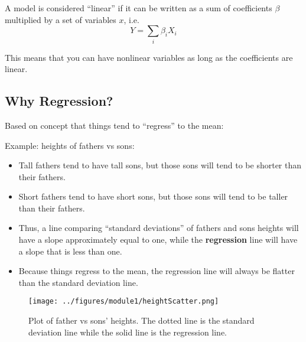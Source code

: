 \documentclass[12pt]{../notes}
\begin{document}
A model is considered ``linear'' if it can be written as a sum of coefficients $\beta$ multiplied by a set of variables $x$, i.e. 
\[Y = \sum_i\beta_iX_i\]

This means that you can have nonlinear variables as long as the coefficients are linear.


\begin{minipage}[l][0.25cm][c]{\textwidth}
\end{minipage}

\subsection{Why Regression?}
Based on concept that things tend to ``regress'' to the mean:

Example: heights of fathers vs sons:
\begin{itemize}
\item Tall fathers tend to have tall sons, but those sons will tend to be shorter than their fathers. 
\item Short fathers tend to have short sons, but those sons will tend to be taller than their fathers. 
\item Thus, a line comparing ``standard deviations'' of fathers and sons heights will have a slope approximately equal to one, while the \textbf{regression} line will have a slope that is less than one. 
\item Because things regress to the mean, the regression line will always be flatter than the standard deviation line. 
\end{itemize}

\begin{figure}[H]
\centering
\texttt{[image: ../figures/module1/heightScatter.png]}
\caption{Plot of father vs sons' heights. The dotted line is the standard deviation line while the solid line is the regression line.}
\end{figure}
\end{document}
